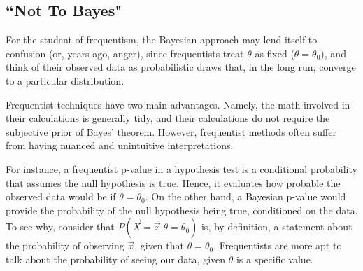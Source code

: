 \documentclass[12pt,twoside]{reedthesis}
\begin{document}
	\subsection*{``Not To Bayes"}
	For the student of frequentism, the Bayesian approach may lend itself to confusion (or, years ago, anger), since frequentists treat $\theta$ as fixed ($\theta = \theta_0$), and think of their observed data as probabilistic draws that, in the long run, converge to a particular distribution.
	
	Frequentist techniques have two main advantages. Namely, the math involved in their calculations is generally tidy, and their calculations do not require the subjective prior of Bayes' theorem. However, frequentist methods often suffer from having nuanced and unintuitive interpretations. 
	
	For instance, a frequentist p-value in a hypothesis test is a conditional probability that assumes the null hypothesis is true. Hence, it evaluates how probable the observed data would be if $\theta = \theta_0$. On the other hand, a Bayesian p-value would provide the probability of the null hypothesis being true, conditioned on the data. To see why, consider that $P(\vec{X} = \vec{x} | \theta = \theta_0 )$ is, by definition, a statement about the probability of observing $\vec{x}$, given that $\theta = \theta_0$. Frequentists are more apt to talk about the probability of seeing our data, given $\theta$ is a specific value.
\end{document}
